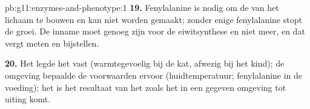 \begin{solution}{pb:g11:enzymes-and-phenotype:1}
\textbf{19.} Fenylalanine is nodig om de  van het lichaam te
bouwen en kan niet worden gemaakt; zonder enige fenylalanine stopt de
groei. De inname moet genoeg zijn voor de eiwitsynthese en niet meer, en
dat vergt meten en bijstellen.

\textbf{20.} Het  legde het  vast (warmtegevoelig bij de kat,
afwezig bij het kind); de omgeving bepaalde de voorwaarden ervoor
(huidtemperatuur; fenylalanine in de voeding); het  is het
resultaat van het  zoals het in een gegeven omgeving tot uiting
komt.
\end{solution}
